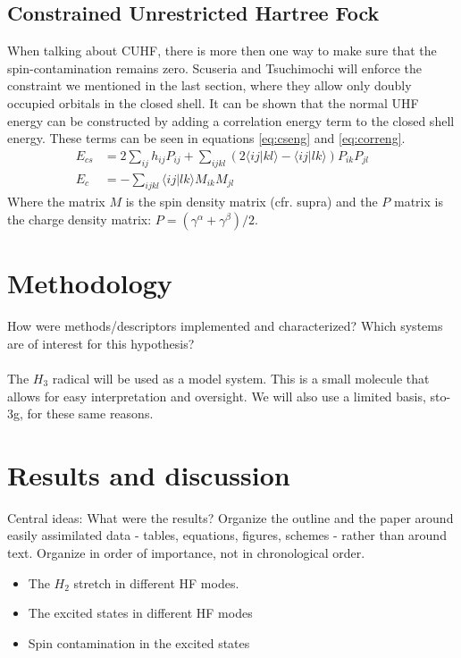 \documentclass[twoside,twocolumn,9pt]{article}
\begin{document}
\subsection{Constrained Unrestricted Hartree Fock}
When talking about CUHF, there is more then one way to make sure that the spin-contamination remains zero. Scuseria and Tsuchimochi will enforce the constraint we mentioned in the 
last section, where they allow only doubly occupied orbitals in the closed shell\cite{Scuseria2010}. It can be shown that the normal UHF energy can be constructed by adding a 
correlation energy term to the closed shell energy. These terms can be seen in equations \eqref{eq:cseng} and \eqref{eq:correng}\cite{Savin2010}.
\begin{subequations}
  \begin{align}
    \label{eq:cseng}
    E_{cs} &= 2\sum_{ij}h_{ij}P_{ij} + \sum_{ijkl}(2\langle ij|kl\rangle - \langle ij|lk \rangle)P_{ik}P_{jl}&&\\
    \label{eq:correng}
    E_c &= -\sum_{ijkl}\langle ij|lk \rangle M_{ik}M_{jl}&&
  \end{align}
\end{subequations}
Where the matrix $M$ is the spin density matrix (cfr. supra) and the $P$ matrix is the charge density matrix: $P = (\gamma^\alpha + \gamma^\beta)/2$. 

\section{Methodology}

How were methods/descriptors implemented and characterized? Which systems are of interest for this hypothesis?
\paragraph*{}
The $H_3$ radical will be used as a model system. This is a small molecule that allows for easy interpretation and oversight. We will also use a limited basis, sto-3g, for these same reasons.
\section{Results and discussion}

Central ideas: What were the results? Organize the outline and the paper around easily assimilated data - tables, equations, figures, schemes - rather than around text. Organize in order of importance, not in chronological order.

\begin{itemize}
    \item The $H_2$ stretch in different HF modes.
    \item The excited states in different HF modes
    \item Spin contamination in the excited states
\end{itemize}
\end{document}
